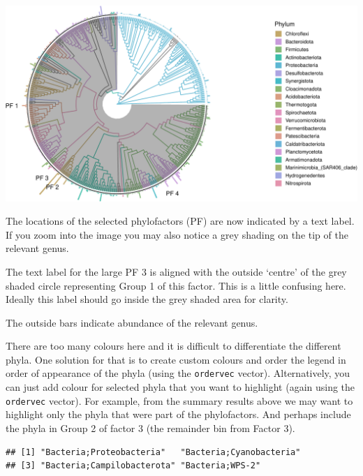 \documentclass[
]{book}
\newenvironment{Shaded}{\begin{snugshade}}{\end{snugshade}}
\newcommand{\CommentTok}[1]{\textcolor[rgb]{0.56,0.35,0.01}{\textit{#1}}}
\newcommand{\NormalTok}[1]{#1}
\newcommand{\SpecialCharTok}[1]{\textcolor[rgb]{0.00,0.00,0.00}{#1}}
\begin{document}
\includegraphics{gitbook-demo_files/figure-latex/coloredtree-1.pdf}

The locations of the selected phylofactors (PF) are now indicated by a text label. If you zoom into the image you may also notice a grey shading on the tip of the relevant genus.

The text label for the large PF 3 is aligned with the outside `centre' of the grey shaded circle representing Group 1 of this factor. This is a little confusing here. Ideally this label should go inside the grey shaded area for clarity.

The outside bars indicate abundance of the relevant genus.

There are too many colours here and it is difficult to differentiate the different phyla. One solution for that is to create custom colours and order the legend in order of appearance of the phyla (using the \texttt{ordervec} vector). Alternatively, you can just add colour for selected phyla that you want to highlight (again using the \texttt{ordervec} vector). For example, from the summary results above we may want to highlight only the phyla that were part of the phylofactors. And perhaps include the phyla in Group 2 of factor 3 (the remainder bin from Factor 3).

\begin{Shaded}
\end{Shaded}

\begin{verbatim}
## [1] "Bacteria;Proteobacteria"   "Bacteria;Cyanobacteria"   
## [3] "Bacteria;Campilobacterota" "Bacteria;WPS-2"
\end{verbatim}
\end{document}
